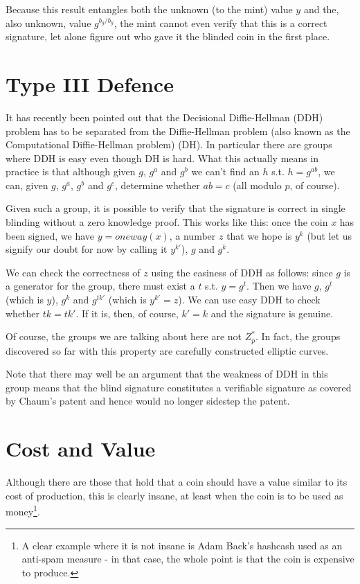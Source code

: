 \documentclass[a4paper,titlepage]{article}
\begin{document}
Because this result entangles both the unknown (to the mint) value $y$
and the, also unknown, value $g^{b_g/b_y}$, the mint cannot even
verify that this is a correct signature, let alone figure out who gave
it the blinded coin in the first place.

\section{Type III Defence}

It has recently been pointed out that the Decisional Diffie-Hellman
(DDH) problem has to be separated from the Diffie-Hellman problem
(also known as the Computational Diffie-Hellman problem) (DH). In
particular there are groups where DDH is easy even though DH is
hard. What this actually means in practice is that although given $g$,
$g^a$ and $g^b$ we can't find an $h$ s.t. $h=g^{ab}$, we can, given
$g$, $g^a$, $g^b$ and $g^c$, determine whether $ab=c$ (all modulo $p$,
of course).\cite{Joux}

Given such a group, it is possible to verify that the signature is
correct in single blinding without a zero knowledge proof. This works
like this: once the coin $x$ has been signed, we have $y=oneway(x)$, a
number $z$ that we hope is $y^k$ (but let us signify our doubt for now
by calling it $y^{k'}$), $g$ and $g^k$.\cite{Goldberg}

We can check the correctness of $z$ using the easiness of DDH
as follows: since $g$ is a generator for the group, there must exist a
$t$ s.t. $y=g^t$. Then we have $g$, $g^t$ (which is $y$), $g^k$ and
$g^{tk'}$ (which is $y^{k'}=z$). We can use easy DDH to check whether
$tk=tk'$. If it is, then, of course, $k'=k$ and the signature is
genuine.

Of course, the groups we are talking about here are not $Z_p^*$. In
fact, the groups discovered so far with this property are carefully
constructed elliptic curves.

Note that there may well be an argument that the weakness of DDH in
this group means that the blind signature constitutes a verifiable
signature as covered by Chaum's patent and hence would no longer
sidestep the patent.

\section{Cost and Value}

Although there are those that hold that a coin should have a value
similar to its cost of production, this is clearly insane, at least
when the coin is to be used as money\footnote{A clear example where it
is not insane is Adam Back's hashcash used as an anti-spam measure -
in that case, the whole point is that the coin is expensive to
produce.}.
\end{document}
